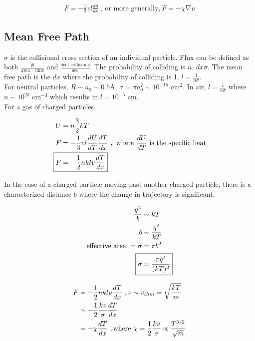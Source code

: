\begin{align}
F = -\frac{1}{3}vl\frac{du}{dx}~,~\text{or more generally,}~F=-\chi \nabla u
\end{align}

\subsection{Mean Free Path}
$\sigma$ is the collisional cross section of an individual particle. Flux can be defined as both $\frac{\text{\#}}{\text{area $\cdot$ time}}$ and $\frac{\text{\# of collisions}}{\text{sec}}$. The probability of colliding is $n \cdot dx \sigma$. The mean free path is the $dx$ where the probability of colliding is 1. $l = \frac{1}{n \sigma}$.\\
For neutral particles, $ R \sim a_0 \sim 0.5$\AA. $\sigma = \pi a_0^2 \sim 10^{-15}$ cm$^2$. In air, $l = \frac{1}{n \sigma}$ where $ n \sim 10^{20}$ cm$^{-3}$ which results in $l = 10^{-5}$ cm. \\

For a gas of charged particles,

\begin{align}
U &= n\frac{3}{2}kT\\
F &= -\frac{1}{3}vl \frac{dU}{dT}\frac{dT}{dx}~,~\text{where}~\frac{dU}{dT}~\text{is the specific heat}\\
\Aboxed{F &= -\frac{1}{2}nklv \frac{dT}{dx}}~.
\end{align}

In the case of a charged particle moving past another charged particle, there is a characterized distance $b$ where the change in trajectory is significant. 

\begin{align}
\frac{q^2}{b} &\sim kT\\
b &\sim \frac{q^2}{kT}\\
\text{effective area }=\sigma &= \pi b^2\\
\Aboxed{\sigma &= \frac{\pi q^4}{(kT)^2}}
\end{align}

\begin{align}
F &=-\frac{1}{2}nklv\frac{dT}{dx}~,v \sim v_{thm} = \sqrt{\frac{kT}{m}}\\
&\sim -\frac{1}{2} \frac{kv}{\sigma}\frac{dT}{dx}\\
&=-\chi \frac{dT}{dx}~,\text{where }\chi =\frac{1}{2}\frac{kv}{\sigma} \propto \frac{T^{5/2}}{\sqrt{m}}
\end{align}

